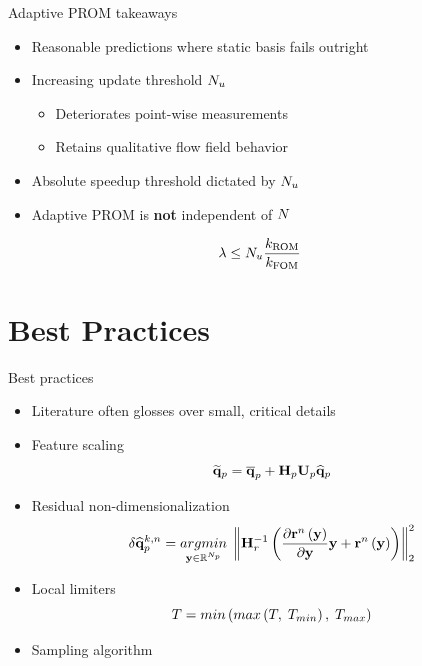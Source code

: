 \documentclass[]{beamer}
\begin{document}
\begin{frame}{Adaptive PROM takeaways}
	\begin{itemize}
		\item Reasonable predictions where static basis fails outright
		\item Increasing update threshold $N_u$
		\begin{itemize}
			\item Deteriorates point-wise measurements
			\item Retains qualitative flow field behavior
		\end{itemize}
		\item Absolute speedup threshold dictated by $N_u$
		\item Adaptive PROM is \textbf{not} independent of $N$
	\end{itemize}

	\begin{equation*}
		\lambda \le N_u \frac{k_{\text{ROM}}}{k_{\text{FOM}}} 
	\end{equation*}
\end{frame}

\section*{Best Practices}

\begin{frame}{Best practices}
	\begin{itemize}
		\item Literature often glosses over small, critical details
		\item Feature scaling
		\begin{equation*}
			\primVecRom = \primVecCent + \primScale \primTrial \primVecCoef
		\end{equation*}
		\item Residual non-dimensionalization
		\begin{equation*}
			\delta \primVecCoef^{\newtonIdx, \timeIdx} = \argmin{\dummyVec \in \mathbb{R}^{\numPrimModes}} \norm{\resScaleInv \left(\pde{\resFuncIter{\timeIdx}{\dummyVec}}{\dummyVec} \dummyVec + \resFuncIter{\timeIdx}{\dummyVec}\right)}_2^2
		\end{equation*}
		\item Local limiters
		\begin{equation*}
			T = min\left(max\left(T, \; T_{min}\right), \; T_{max}\right)
		\end{equation*}
		\item Sampling algorithm
	\end{itemize}
\end{frame}
\end{document}
